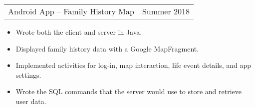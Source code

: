 \documentclass{article}
\newenvironment{compactItemize}{
  \begin{itemize}[itemsep=0ex, parsep=0ex, partopsep=0ex, topsep= -7pt]
}{
  \end{itemize}
}
\newcommand{\project}[2]{
  \begingroup
  \setlength{\tabcolsep}{0ex}
  \begin{tabularx}{\linewidth}{X r}
    #1 & %
    #2\\ %
  \end{tabularx}%
  \endgroup%
}
\begin{document}
\project{Android App -- Family History Map}{Summer 2018}
\begin{compactItemize}
  \item Wrote both the client and server in Java.
  \item Displayed family history data with a Google MapFragment.
  \item Implemented activities for log-in, map interaction, life event details, and app settings.
  \item Wrote the SQL commands that the server would use to store and retrieve user data.
\end{compactItemize}

\begin{comment}
  TODO:
  -Macro command for courses list.
  -Push macros into other file (lsResume.sty)
  -Projects:
    >

      \subsection*{Graph-Based Image Segmentation}
  \subsection*{SVD Image Compression}
  \subsection*{Facial Recognition with Eigenfaces}
  \subsection*{Applications of PageRank Algorithm}
  \subsection*{Drazin Inverse for Social Network Link Prediction}
  \subsection*{Jacobi, Gauss-Seidel, and Successive Over-Relaxation for Solving Linear Systems}
  \subsection*{Linked Lists}
  \subsection*{Binary Search Trees}
  \subsection*{K-D Trees for K-Nearest Neighbors}
  \subsection*{Breadth First Search and Six Degrees of Kevin Bacon}
  \subsection*{Random Speech Generation with Markov Chains}
  \subsection*{Simplex Method}
\end{comment}
\end{document}
